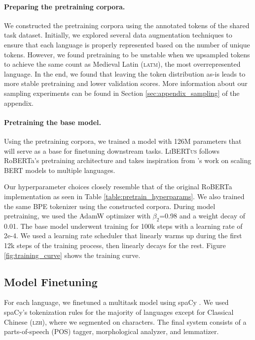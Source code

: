 \documentclass[11pt]{article}
\newcommand{\libertus}{\textsc{LiBERTus}}
\begin{document}
\paragraph{Preparing the pretraining corpora.}
We constructed the pretraining corpora using the annotated tokens of the shared task dataset.
Initially, we explored several data augmentation techniques to ensure that each language is properly represented based on the number of unique tokens.
However, we found pretraining to be unstable when we upsampled tokens to achieve the same count as Medieval Latin (\textsc{latm}), the most overrepresented language.
In the end, we found that leaving the token distribution as-is leads to more stable pretraining and lower validation scores.
More information about our sampling experiments can be found in Section \ref{sec:appendix_sampling} of the appendix.

\paragraph{Pretraining the base model.}
Using the pretraining corpora, we trained a model with 126M parameters that will serve as a base for finetuning downstream tasks.
\libertus{} follows RoBERTa's pretraining architecture \cite{liu-etal-2019-roberta} and takes inspiration from \citet{conneau-etal-2020-unsupervised}'s work on scaling BERT models to multiple languages.



Our hyperparameter choices closely resemble that of the original RoBERTa implementation as seen in Table \ref{table:pretrain_hyperparams}.
We also trained the same BPE tokenizer \citep{sennrich-etal-2016-neural} using the constructed corpora.
During model pretraining, we used the AdamW optimizer with $\beta_2$=0.98 and a weight decay of 0.01.
The base model underwent training for 100k steps with a learning rate of 2e-4.
We used a learning rate scheduler that linearly warms up during the first 12k steps of the training process, then linearly decays for the rest.
Figure \ref{fig:training_curve} shows the training curve.

\subsection{Model Finetuning}

For each language, we finetuned a multitask model using spaCy \cite{honnibal-etal-2020-spacy}.
We used spaCy's tokenization rules for the majority of languages except for Classical Chinese (\textsc{lzh}), where we segmented on characters.
The final system consists of a parts-of-speech (POS) tagger, morphological analyzer, and lemmatizer.
\end{document}
